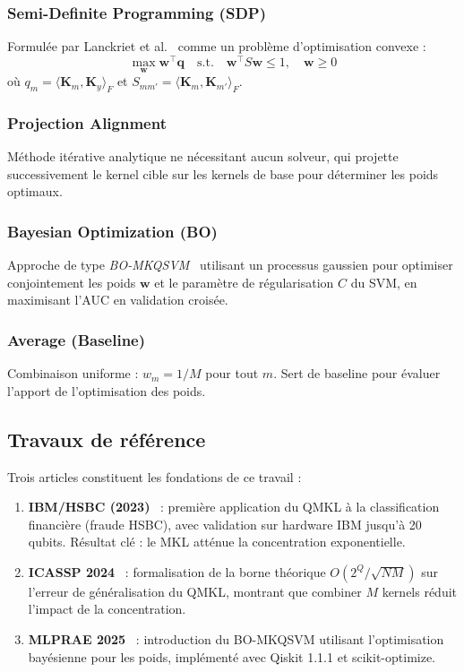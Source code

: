 \documentclass[12pt,a4paper]{article}
\newcommand{\K}{\mathbf{K}}
\newcommand{\w}{\mathbf{w}}
\begin{document}
\subsubsection{Semi-Definite Programming (SDP)}
Formulée par Lanckriet et al.~\cite{lanckriet2004} comme un problème d'optimisation convexe :
\begin{equation}
\max_{\w} \w^\top \mathbf{q} \quad \text{s.t.} \quad \w^\top S \w \leq 1, \quad \w \geq 0
\label{eq:sdp}
\end{equation}
où $q_m = \langle \K_m, \K_y \rangle_F$ et $S_{mm'} = \langle \K_m, \K_{m'} \rangle_F$.

\subsubsection{Projection Alignment}
Méthode itérative analytique ne nécessitant aucun solveur, qui projette successivement le kernel cible sur les kernels de base pour déterminer les poids optimaux.

\subsubsection{Bayesian Optimization (BO)}
Approche de type \textit{BO-MKQSVM}~\cite{mlprae2025} utilisant un processus gaussien pour optimiser conjointement les poids $\w$ et le paramètre de régularisation $C$ du SVM, en maximisant l'AUC en validation croisée.

\subsubsection{Average (Baseline)}
Combinaison uniforme : $w_m = 1/M$ pour tout $m$. Sert de baseline pour évaluer l'apport de l'optimisation des poids.

\subsection{Travaux de référence}

Trois articles constituent les fondations de ce travail :

\begin{enumerate}
    \item \textbf{IBM/HSBC (2023)}~\cite{ibm2023} : première application du QMKL à la classification financière (fraude HSBC), avec validation sur hardware IBM jusqu'à 20 qubits. Résultat clé : le MKL atténue la concentration exponentielle.

    \item \textbf{ICASSP 2024}~\cite{icassp2024} : formalisation de la borne théorique $O(2^Q / \sqrt{NM})$ sur l'erreur de généralisation du QMKL, montrant que combiner $M$ kernels réduit l'impact de la concentration.

    \item \textbf{MLPRAE 2025}~\cite{mlprae2025} : introduction du BO-MKQSVM utilisant l'optimisation bayésienne pour les poids, implémenté avec Qiskit 1.1.1 et scikit-optimize.
\end{enumerate}
\end{document}
